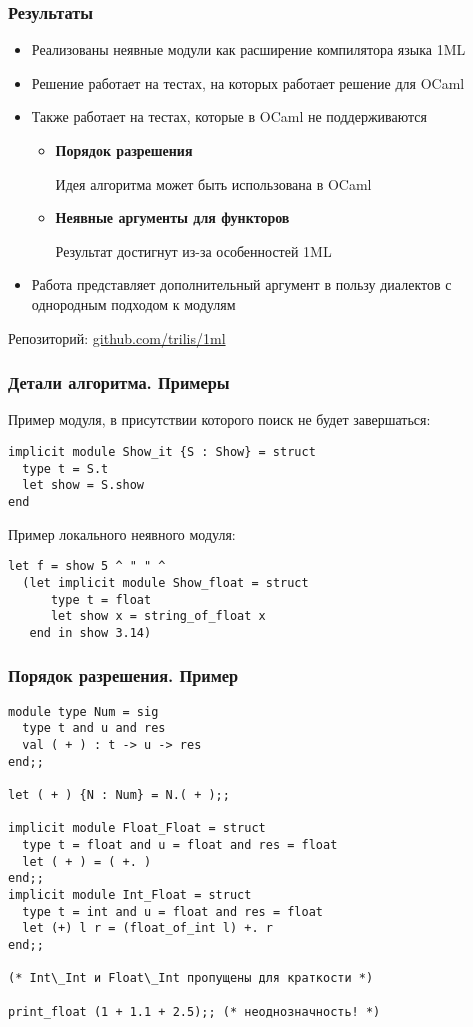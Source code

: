 \documentclass{beamer}
\newcommand{\backupbegin}{
   \newcounter{framenumberappendix}
   \setcounter{framenumberappendix}{\value{framenumber}}
}
\begin{document}
\begin{frame}\frametitle{Результаты}
\begin{itemize}
    \item Реализованы неявные модули как расширение компилятора языка 1ML
    \item Решение работает на тестах, на которых работает решение для OCaml
    \item Также работает на тестах, которые в OCaml не поддерживаются
    \begin{itemize}
        \item \textbf{Порядок разрешения}

        Идея алгоритма может быть использована в OCaml
        \item \textbf{Неявные аргументы для функторов}

        Результат достигнут из-за особенностей 1ML
    \end{itemize}
    \item Работа представляет дополнительный аргумент в пользу диалектов с однородным подходом к модулям
\end{itemize}
Репозиторий: \url{github.com/trilis/1ml}
\end{frame}

\appendix
\backupbegin

\lstset{language=caml}
\begin{frame}[fragile]\frametitle{Детали алгоритма. Примеры}
Пример модуля, в присутствии которого поиск не будет завершаться:
\begin{lstlisting}[style=base2]
implicit module Show_it {S : Show} = struct
  type t = S.t
  let show = S.show
end
\end{lstlisting}
Пример локального неявного модуля:
\begin{lstlisting}[style=base2]
let f = show 5 ^ " " ^
  (let implicit module Show_float = struct
      type t = float
      let show x = string_of_float x
   end in show 3.14)
\end{lstlisting}
\end{frame}

\lstset{language=caml}
\begin{frame}[fragile]\frametitle{Порядок разрешения. Пример}
\begin{lstlisting}[style=base2]
module type Num = sig
  type t and u and res
  val ( + ) : t -> u -> res
end;;

let ( + ) {N : Num} = N.( + );;

implicit module Float_Float = struct
  type t = float and u = float and res = float
  let ( + ) = ( +. )
end;;
implicit module Int_Float = struct
  type t = int and u = float and res = float
  let (+) l r = (float_of_int l) +. r
end;;

(* Int\_Int и Float\_Int пропущены для краткости *)

print_float (1 + 1.1 + 2.5);; (* неоднозначность! *)
\end{lstlisting}
\end{frame}
\end{document}

